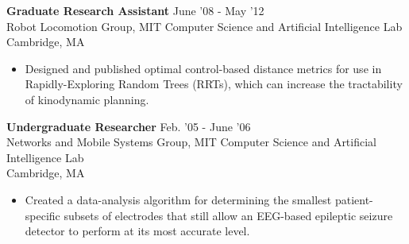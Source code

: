 \documentclass[margin]{res}
\begin{document}
\begin{resume}
 {\bf Graduate Research Assistant} \hfill June '08 - May '12 \\ Robot Locomotion Group, MIT Computer Science and Artificial Intelligence Lab \\ Cambridge, MA 
 \begin{itemize} \itemsep -2pt  %
 \item Designed and published optimal control-based distance metrics for use in Rapidly-Exploring Random Trees (RRTs), which can increase the tractability of kinodynamic planning.
 \end{itemize}
 
% 
  {\bf Undergraduate Researcher} \hfill Feb. '05 - June '06 \\ Networks and Mobile Systems Group, MIT Computer Science and Artificial Intelligence Lab \\ Cambridge, MA 
 \begin{itemize} \itemsep -2pt  %
\item Created a data-analysis algorithm for determining the smallest patient-specific subsets of electrodes that still allow an EEG-based epileptic seizure detector to perform at its most accurate level. 
\end{itemize}
 
 
 



\end{resume}
\end{document}
